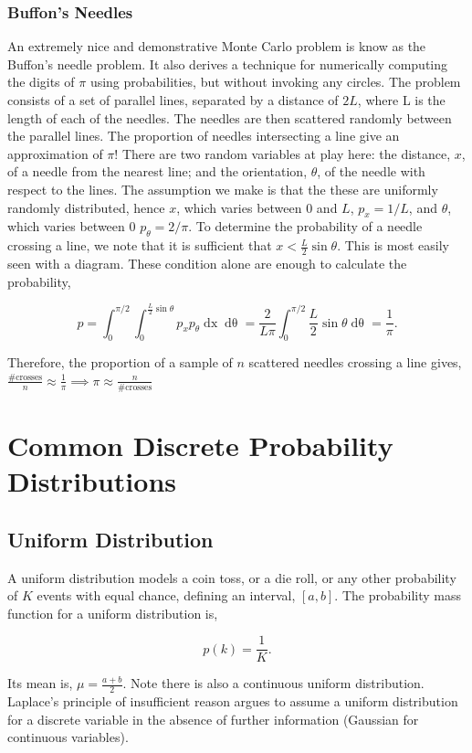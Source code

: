 \documentclass[11pt]{amsart}
\begin{document}
\subsubsection{Buffon's Needles}
An extremely nice and demonstrative Monte Carlo problem is know as the Buffon's needle problem. It also derives a technique for numerically computing the digits of $\pi$ using probabilities, but without invoking any circles. The problem consists of a set of parallel lines, separated by a distance of $2L$, where L is the length of each of the needles. The needles are then scattered randomly between the parallel lines. The proportion of needles intersecting a line give an approximation of $\pi$! There are two random variables at play here: the distance, $x$, of a needle from the nearest line; and the orientation, $\theta$, of the needle with respect to the lines. The assumption we make is that the these are uniformly randomly distributed, hence $x$, which varies between 0 and $L$, $p_x = 1/L$, and $\theta$, which varies between $0$ $p_{\theta} = 2/\pi$. To determine the probability of a needle crossing a line, we note that it is sufficient that $x < \frac{L}{2}\sin\theta$. This is most easily seen with a diagram. These condition alone are enough to calculate the probability,

$$
p = \int_{0}^{\pi/2}\int_{0}^{\frac{L}{2}\sin\theta}p_xp_{\theta}\mathop{dx}\mathop{d\theta} = \frac{2}{L\pi}\int_{0}^{\pi/2}\frac{L}{2}\sin\theta\mathop{d\theta} = \frac{1}{\pi}.
$$

Therefore, the proportion of a sample of $n$ scattered needles crossing a line gives, $\frac{\text{\# crosses}}{n} \approx \frac{1}{\pi} \implies \pi \approx \frac{n}{\text{\# crosses}}$

\section{Common Discrete Probability Distributions}

\subsection{Uniform Distribution}

A uniform distribution models a coin toss, or a die roll, or any other probability of $K$ events with equal chance, defining an interval, $[a, b]$. The probability mass function for a uniform distribution is,

$$p(k) = \frac{1}{K}.$$

Its mean is, $\mu = \frac{a + b}{2}$. Note there is also a continuous uniform distribution. Laplace's principle of insufficient reason argues to assume a uniform distribution for a discrete variable in the absence of further information (Gaussian for continuous variables).
\end{document}
